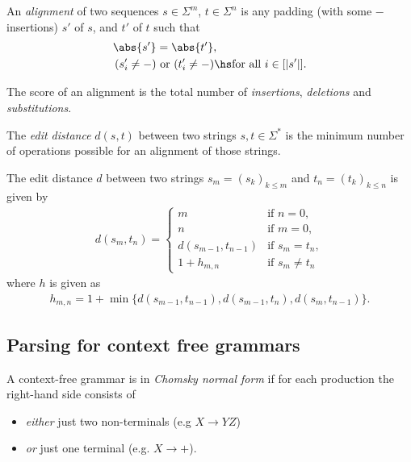 \documentclass{article}
\begin{document}
\begin{definition}
	An \emph{alignment} of two sequences $s\in\Sigma^m$, $t\in\Sigma^n$ is
	any padding (with some $-$ insertions) $s'$ of $s$, and $t'$ of $t$ such that
	\begin{align*}
		\abs{s'}     & =\abs{t'},                                           \\
		(s'_i\not=-) & \text{ or }(t'_i\not=-)\hs\text{for all }i\in[|s'|].
	\end{align*}
\end{definition}

\begin{definition}
	The score of an alignment is the total number of \emph{insertions},
	\emph{deletions} and \emph{substitutions}.
\end{definition}

\begin{definition}
	The \emph{edit distance} $d(s,t)$ between two strings $s,t\in\Sigma^*$ is the
	minimum number of operations possible for an alignment of those strings.
\end{definition}

\begin{theorem}
	The edit distance $d$ between two strings $s_m=(s_k)_{k\leq m}$
	and $t_n=(t_k)_{k\leq n}$ is given by
	\begin{align*}
		d(s_m,t_n) = \begin{cases}
			             m                   & \text{if }n=0,        \\
			             n                   & \text{if }m=0,        \\
			             d(s_{m-1}, t_{n-1}) & \text{if }s_m=t_n,    \\
			             1 + h_{m,n}         & \text{if }s_m\not=t_n
		             \end{cases}
	\end{align*}
	where $h$ is given as
	\begin{align*}
		h_{m,n}= 1 + \min\{d(s_{m-1},t_{n-1}), d(s_{m-1}, t_n), d(s_m, t_{n-1})\}.
	\end{align*}
\end{theorem}

\subsection{Parsing for context free grammars}

\begin{definition}
	A context-free grammar is in \emph{Chomsky normal form} if for
	each production the right-hand side consists of
	\begin{itemize}
		\item \emph{either} just two non-terminals (e.g $X\to YZ$)
		\item \emph{or} just one terminal (e.g. $X\to +$).
	\end{itemize}
\end{definition}
\end{document}
